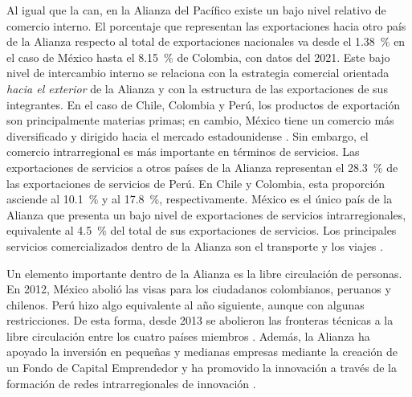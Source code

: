Al igual que la \gls{can}, en la Alianza del Pacífico existe un bajo nivel relativo de comercio interno. El porcentaje que representan las exportaciones hacia otro país de la Alianza respecto al total de exportaciones nacionales va desde el 1.38~\% en el caso de México hasta el 8.15~\% de Colombia, con datos del 2021. Este bajo nivel de intercambio interno se relaciona con la estrategia comercial orientada \textit{hacia el exterior} de la Alianza y con la estructura de las exportaciones de sus integrantes. En el caso de Chile, Colombia y Perú, los productos de exportación son principalmente materias primas; en cambio, México tiene un comercio más diversificado y dirigido hacia el mercado estadounidense \parencite[p.~252]{Ertl2025}. Sin embargo, el comercio intrarregional es más importante en términos de servicios. Las exportaciones de servicios a otros países de la Alianza representan el 28.3~\% de las exportaciones de servicios de Perú. En Chile y Colombia, esta proporción asciende al 10.1~\% y al 17.8~\%, respectivamente. México es el único país de la Alianza que presenta un bajo nivel de exportaciones de servicios intrarregionales, equivalente al 4.5~\% del total de sus exportaciones de servicios. Los principales servicios comercializados dentro de la Alianza son el transporte y los viajes \parencite[p.~253]{Ertl2025}.

Un elemento importante dentro de la Alianza es la libre circulación de personas. En 2012, México abolió las visas para los ciudadanos colombianos, peruanos y chilenos. Perú hizo algo equivalente al año siguiente, aunque con algunas restricciones. De esta forma, desde 2013 se abolieron las fronteras técnicas a la libre circulación entre los cuatro países miembros \parencite[p.~253]{Ertl2025}. Además, la Alianza ha apoyado la inversión en pequeñas y medianas empresas mediante la creación de un Fondo de Capital Emprendedor y ha promovido la innovación a través de la formación de redes intrarregionales de innovación \parencite{AP_9años}.



